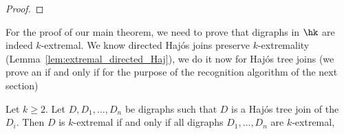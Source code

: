 \begin{proof}
  
    \end{proof}
    
For the proof of our main theorem, we need to prove that digraphs in $\hk$ are indeed $k$-extremal. We know directed Haj\'os joins preserve $k$-extremality (Lemma~\ref{lem:extremal_directed_Haj}), we do it now for Haj\'os tree joins (we prove an if and only if for the purpose of the recognition algorithm of the next section)


\begin{lemma}\label{lem:HT_iff_ext}
 Let $k \geq 2$. Let $D, D_1, \dots, D_n$ be digraphs such that $D$ is a Haj\'os tree join of the $D_i$. Then $D$ is $k$-extremal if and only if all digraphs $D_1, \dots, D_n$ are $k$-extremal,
\end{lemma}
